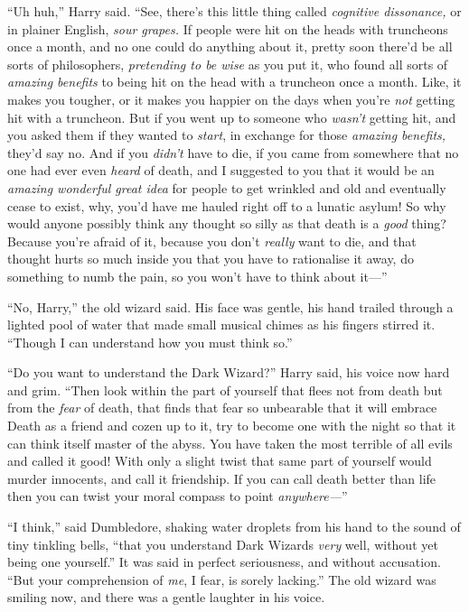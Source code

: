 ``Uh huh,'' Harry said. ``See, there's this little thing called
\emph{cognitive dissonance,} or in plainer English, \emph{sour grapes.}
If people were hit on the heads with truncheons once a month, and no one
could do anything about it, pretty soon there'd be all sorts of
philosophers, \emph{pretending to be wise} as you put it, who found all
sorts of \emph{amazing benefits} to being hit on the head with a
truncheon once a month. Like, it makes you tougher, or it makes you
happier on the days when you're \emph{not} getting hit with a truncheon.
But if you went up to someone who \emph{wasn't} getting hit, and you
asked them if they wanted to \emph{start}, in exchange for those
\emph{amazing benefits,} they'd say no. And if you \emph{didn't} have to
die, if you came from somewhere that no one had ever even \emph{heard}
of death, and I suggested to you that it would be an \emph{amazing
wonderful great idea} for people to get wrinkled and old and eventually
cease to exist, why, you'd have me hauled right off to a lunatic asylum!
So why would anyone possibly think any thought so silly as that death is
a \emph{good} thing? Because you're afraid of it, because you don't
\emph{really} want to die, and that thought hurts so much inside you
that you have to rationalise it away, do something to numb the pain, so
you won't have to think about it---''

``No, Harry,'' the old wizard said. His face was gentle, his hand
trailed through a lighted pool of water that made small musical chimes
as his fingers stirred it. ``Though I can understand how you must think
so.''

``Do you want to understand the Dark Wizard?'' Harry said, his voice now
hard and grim. ``Then look within the part of yourself that flees not
from death but from the \emph{fear} of death, that finds that fear so
unbearable that it will embrace Death as a friend and cozen up to it,
try to become one with the night so that it can think itself master of
the abyss. You have taken the most terrible of all evils and called it
good! With only a slight twist that same part of yourself would murder
innocents, and call it friendship. If you can call death better than
life then you can twist your moral compass to point \emph{anywhere---}''

``I think,'' said Dumbledore, shaking water droplets from his hand to
the sound of tiny tinkling bells, ``that you understand Dark Wizards
\emph{very} well, without yet being one yourself.'' It was said in
perfect seriousness, and without accusation. ``But your comprehension of
\emph{me}, I fear, is sorely lacking.'' The old wizard was smiling now,
and there was a gentle laughter in his voice.

